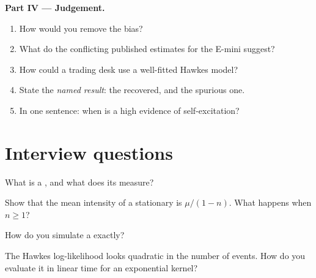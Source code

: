 \begin{problem}
\medskip\noindent\textbf{Part IV --- Judgement.}
\begin{enumerate}[resume]
\item How would you remove the bias?
\item What do the conflicting published estimates for the E-mini suggest?
\item How could a trading desk use a well-fitted Hawkes model?
\item State the \emph{named result}: the  recovered, and the spurious one.
\item In one sentence: when is a high  evidence of self-excitation?
\end{enumerate}
\end{problem}

\section{Interview questions}

\begin{interviewq}\label{iq:qm:point-processes-and-hawkes-processes:1}
What is a , and what does its  measure?
\end{interviewq}

\begin{interviewq}\label{iq:qm:point-processes-and-hawkes-processes:2}
Show that the mean intensity of a stationary  is $\mu/(1 - n)$. What happens when $n \ge 1$?
\end{interviewq}

\begin{interviewq}\label{iq:qm:point-processes-and-hawkes-processes:3}
How do you simulate a  exactly?
\end{interviewq}

\begin{interviewq}\label{iq:qm:point-processes-and-hawkes-processes:4}
The Hawkes log-likelihood looks quadratic in the number of events. How do you evaluate it in linear time for an
exponential kernel?
\end{interviewq}

